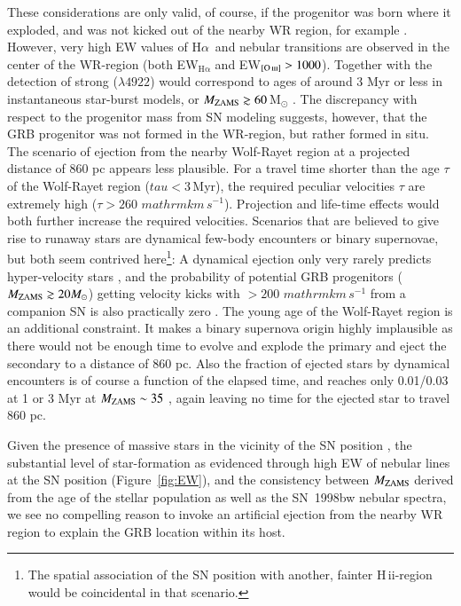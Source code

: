 \documentclass[traditabstract]{aa}
\newcommand{\ha}{H$\alpha$}
\newcommand{\hii}{\mbox{H\,{\sc ii}}}
\newcommand{\hei}{\ion{He}{i}}
\newcommand{\oiii}{[\ion{O}{iii}]}
\begin{document}
These considerations are only valid, of course, if the progenitor was born where it exploded, and was not kicked out of the nearby WR region, for example \citep{2006A&A...454..103H}. However, very high EW values of \ha~and nebular transitions are observed in the center of the WR-region (both EW$_{\mathrm{H\alpha}}$ and EW$_{\oiii}>1000$). Together with the detection of strong \hei($\lambda4922$) would correspond to ages of around 3 Myr or less in instantaneous star-burst models, or $M_{\rm{ZAMS}} \gtrsim 60$\,M$_{\odot}$ \citep[see e.g.,][and references therein]{2015MNRAS.451L..65T}. The discrepancy with respect to the progenitor mass from SN modeling suggests, however, that the GRB progenitor was not formed in the WR-region, but rather formed in situ. The scenario of ejection from the nearby Wolf-Rayet region at a projected distance of 860 pc  \citep{2006A&A...454..103H} appears less plausible. For a travel time shorter than the age $\tau$ of the Wolf-Rayet region ($tau<3$\,Myr), the required peculiar velocities $\tau$ are extremely high ($\tau>260\,\,mathrm{km\,s^{-1}}$). Projection and life-time effects would both further increase the required velocities. Scenarios that are believed to give rise to runaway stars are dynamical few-body encounters or binary supernovae, but both seem contrived here\footnote{The spatial association of the SN position with another, fainter \hii-region would be coincidental in that scenario.}: A dynamical ejection only very rarely predicts hyper-velocity stars \citep{2001A&A...365...49H, 2012ApJ...751..133P}, and the probability of potential GRB progenitors ($M_{\rm{ZAMS}}\gtrsim 20 M_\odot$) getting velocity kicks with $>200\,\,mathrm{km\,s^{-1}}$ from a companion SN is also practically zero \citep{2011MNRAS.414.3501E}. The young age of the Wolf-Rayet region is an additional constraint. It makes a binary supernova origin highly implausible as there would not be enough time to evolve and explode the primary and eject the secondary to a distance of 860 pc. Also the fraction of ejected stars by dynamical encounters is of course a function of the elapsed time, and reaches only 0.01/0.03 at 1 or 3 Myr at $M_{\rm{ZAMS}}\sim 35$ \citep{2012ApJ...746...15B}, again leaving no time for the ejected star to travel 860 pc.

Given the presence of massive stars in the vicinity of the SN position \citep{2000ApJ...542L..89F}, the substantial level of star-formation as evidenced through high EW of nebular lines at the SN position (Figure~\ref{fig:EW}), and the consistency between $M_{\rm{ZAMS}}$ derived from the age of the stellar population as well as the SN~1998bw nebular spectra, we see no compelling reason to invoke an artificial ejection from the nearby WR region to explain the GRB location within its host.
\end{document}
